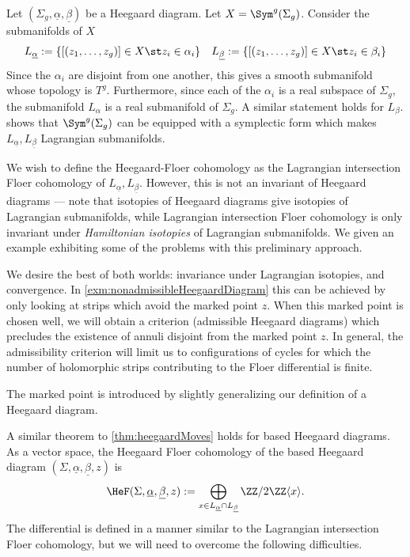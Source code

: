 
Let $(\Sigma_g, \underline{\alpha}, \underline{\beta})$ be a Heegaard diagram. Let $X=\Sym^g(\Sigma_g)$. Consider the submanifolds of $X$
\begin{align*}
    L_{\underline \alpha}:=\{[(z_1, \ldots, z_g)]\in X\st z_i\in \alpha_i\} && 
    L_{\underline \beta}:=\{[(z_1, \ldots, z_g)]\in X\st z_i\in \beta_i\}
\end{align*}
Since the $\alpha_i$ are disjoint from one another, this gives a smooth submanifold whose topology is $T^g$. Furthermore, since each of the $\alpha_i$ is a real subspace of $\Sigma_g$, the submanifold $L_\alpha$ is a real submanifold of $\Sigma_g$. A similar statement holds for $L_\beta$. \Cite{perutz2008handleslide} shows that $\Sym^g(\Sigma_g)$ can be equipped with a symplectic form which makes $L_{\underline \alpha},L_{\underline \beta}$ Lagrangian submanifolds. 

We wish to define the Heegaard-Floer cohomology as the Lagrangian intersection Floer cohomology of $L_{\underline \alpha},L_{\underline \beta}$. However, this is not an invariant of Heegaard diagrams --- note that isotopies of Heegaard diagrams give isotopies of Lagrangian submanifolds, while Lagrangian intersection Floer cohomology is only invariant under \emph{Hamiltonian isotopies} of Lagrangian submanifolds. We given an example exhibiting some of the problems with this preliminary approach.



We desire the best of both worlds: invariance under Lagrangian isotopies, and convergence. In \cref{exm:nonadmissibleHeegaardDiagram} this can be achieved by only looking at strips which avoid the marked point $z$. When this marked point is chosen well, we will obtain a criterion (admissible Heegaard diagrams) which precludes the existence of annuli disjoint from the marked point $z$.  In general, the admissibility criterion will limit us to configurations of cycles for which the number of holomorphic strips contributing to the Floer differential is finite.

The marked point is introduced by slightly generalizing our definition of a Heegaard diagram. 

A similar theorem to \cref{thm:heegaardMoves} holds for based Heegaard diagrams.
As a vector space, the Heegaard Floer cohomology of the based Heegaard diagram $(\Sigma,\underline{\alpha}, \underline{\beta},z)$ is
\[\HeF(\Sigma, \underline{\alpha}, \underline{\beta},z):=\bigoplus_{x\in L_{\underline \alpha}\cap L_{\underline{\beta}}} \ZZ/2\ZZ\langle x\rangle.\]
The differential is defined in a manner similar to the Lagrangian intersection Floer cohomology, but we will need to overcome the following difficulties.

